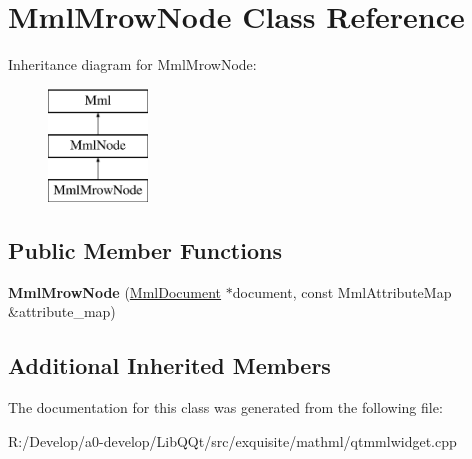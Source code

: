 \hypertarget{class_mml_mrow_node}{}\section{Mml\+Mrow\+Node Class Reference}
\label{class_mml_mrow_node}
Inheritance diagram for Mml\+Mrow\+Node\+:\begin{figure}[H]
\begin{center}
\leavevmode
\includegraphics[height=3.000000cm]{class_mml_mrow_node}
\end{center}
\end{figure}
\subsection*{Public Member Functions}
\begin{DoxyCompactItemize}
\item 
\mbox{\label{class_mml_mrow_node_a8778a0e621979b9cbec1d9b0b3e627b6}} 
{\bfseries Mml\+Mrow\+Node} (\mbox{\hyperlink{class_mml_document}{Mml\+Document}} $\ast$document, const Mml\+Attribute\+Map \&attribute\+\_\+map)
\end{DoxyCompactItemize}
\subsection*{Additional Inherited Members}


The documentation for this class was generated from the following file\+:\begin{DoxyCompactItemize}
\item 
R\+:/\+Develop/a0-\/develop/\+Lib\+Q\+Qt/src/exquisite/mathml/qtmmlwidget.\+cpp\end{DoxyCompactItemize}
